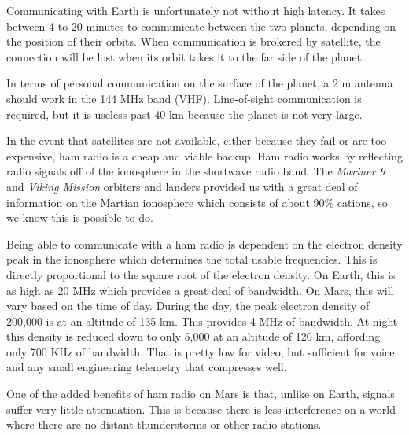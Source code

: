 

Communicating with Earth is unfortunately not without high latency. It takes between 4 to 20 minutes to communicate between the two planets, depending on the position of their orbits. When communication is brokered by satellite, the connection will be lost when its orbit takes it to the far side of the planet.

In terms of personal communication on the surface of the planet, a 2 m antenna should work in the 144 MHz band (VHF). Line-of-sight communication is required, but it is useless past 40 km because the planet is not very large.

In the event that satellites are not available, either because they fail or are too expensive, ham radio is a cheap and viable backup. Ham radio works by reflecting radio signals off of the ionosphere in the shortwave radio band. The {\it Mariner 9} and {\it Viking Mission} orbiters and landers provided us with a great deal of information on the Martian ionosphere which consists of about 90\%  cations, so we know this is possible to do.

Being able to communicate with a ham radio is dependent on the electron density peak in the ionosphere which determines the total usable frequencies. This is directly proportional to the square root of the electron density. On Earth, this is as high as 20 MHz which provides a great deal of bandwidth. On Mars, this will vary based on the time of day. During the day, the peak electron density of 200,000  is at an altitude of 135 km. This provides 4 MHz of bandwidth. At night this density is reduced down to only 5,000  at an altitude of 120 km, affording only 700 KHz of bandwidth. That is pretty low for video, but sufficient for voice and any small engineering telemetry that compresses well.

One of the added benefits of ham radio on Mars is that, unlike on Earth, signals suffer very little attenuation. This is because there is less interference on a world where there are no distant thunderstorms or other radio stations.

